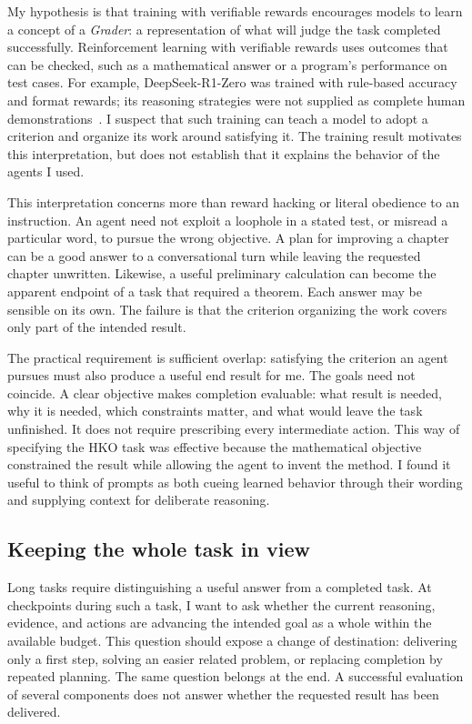 My hypothesis is that training with verifiable rewards encourages models to
learn a concept of a \emph{Grader}: a representation of what will judge the
task completed successfully. Reinforcement learning with verifiable rewards
uses outcomes that can be checked, such as a mathematical answer or a
program's performance on test cases. For example, DeepSeek-R1-Zero was
trained with rule-based accuracy and format rewards; its reasoning strategies
were not supplied as complete human demonstrations~\cite{aiGuo2025}.
I suspect that such training can teach a model to adopt a criterion and
organize its work around satisfying it. The training result motivates this
interpretation, but does not establish that it explains the behavior of the
agents I used.

This interpretation concerns more than reward hacking or literal obedience
to an instruction. An agent need not exploit a loophole in a stated test, or
misread a particular word, to pursue the wrong objective. A plan for improving
a chapter can be a good answer to a conversational turn while leaving the
requested chapter unwritten. Likewise, a useful preliminary calculation can
become the apparent endpoint of a task that required a theorem. Each answer
may be sensible on its own. The failure is that the criterion organizing the
work covers only part of the intended result.

The practical requirement is sufficient overlap: satisfying the criterion an
agent pursues must also produce a useful end result for me. The goals need
not coincide. A clear objective makes completion evaluable: what result is
needed, why it is needed, which constraints matter, and what would leave the
task unfinished. It does not require prescribing
every intermediate action. This way of specifying the HKO task was effective
because the mathematical objective constrained the result while allowing the
agent to invent the method. I found it useful to think of prompts as both cueing
learned behavior through their wording and supplying context for deliberate
reasoning.

\subsection{Keeping the whole task in view}

Long tasks require distinguishing a useful answer from a completed task.
At checkpoints during such a task, I
want to ask whether the current reasoning, evidence, and actions are advancing
the intended goal as a whole within the available budget. This question should
expose a change of destination: delivering only a first step, solving an easier
related problem, or replacing completion by repeated planning. The same
question belongs at the end. A successful evaluation of several components
does not answer whether the requested result has been delivered.

